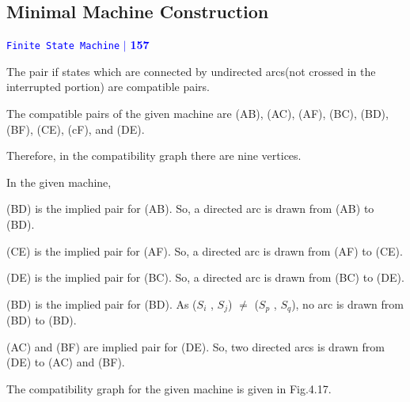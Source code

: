 \documentclass[9pt]{beamer}
\begin{document}
\begin{frame}
\section*{Minimal Machine Construction}
\begin{flushright}
 \textcolor{blue}{\hspace*{0.5cm} \texttt{Finite State Machine} \hspace*{0.10cm}\textbf{$|$} \textbf{157}\hspace*{0.5cm}}
\end{flushright}

\vspace*{1cm}


The pair if states which are connected by undirected arcs(not crossed in the interrupted portion) are compatible pairs.

\pause

The compatible pairs of the given machine are (AB), (AC), (AF), (BC), (BD), (BF), (CE), (cF), and (DE).

\pause

Therefore, in the compatibility graph there are nine vertices.

\pause

In the given machine,
\vspace*{0.10cm}

(BD) is the implied pair for (AB). So, a directed arc is drawn from (AB) to (BD).

\end{frame}

\begin{frame}


(CE) is the implied pair for (AF). So, a directed arc is drawn from (AF) to (CE).

\pause

(DE) is the implied pair for (BC). So, a directed arc is drawn from (BC) to (DE).

\pause

(BD) is the implied pair for (BD). As ($S_{i}$ , $S_{j}$) $\neq$ ($S_{p}$ , $S_{q}$), no arc is drawn from (BD) to (BD).

\pause

(AC) and (BF) are implied pair for (DE). So, two directed arcs is drawn from (DE) to (AC) and (BF).

\pause

The compatibility graph for the given machine is given in Fig.4.17.

\end{frame}
\end{document}
